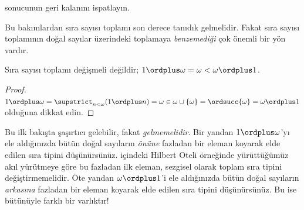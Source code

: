 \begin{prob}
 sonucunun geri
kalanını ispatlayın.
\end{prob}

Bu bakımlardan sıra sayısı toplamı son derece tanıdık gelmelidir. Fakat sıra
sayısı toplamının doğal sayılar üzerindeki toplamaya 
\emph{benzemediği} çok
önemli bir yön vardır.

\begin{prop}
Sıra sayısı toplamı {değişmeli} değildir;
$1\ordplus\omega=\omega<\omega\ordplus1$.
\end{prop}

\begin{proof}
$1\ordplus\omega=\supstrict_{n<\omega}(1\ordplus n)
=\omega\in\omega\cup\{\omega\}=\ordsucc{\omega}=\omega\ordplus1$
olduğuna dikkat edin.
\end{proof}
\noindent
Bu ilk bakışta şaşırtıcı gelebilir, fakat 
\emph{gelmemelidir}. Bir yandan
$1\ordplus\omega$'yı ele aldığınızda bütün doğal sayıların
\emph{önüne} fazladan bir eleman koyarak elde edilen sıra tipini
düşünürsünüz.  içindeki Hilbert Oteli
örneğinde yürüttüğümüz akıl yürütmeye göre bu fazladan ilk eleman, sezgisel
olarak toplam sıra tipini değiştirmemelidir. Öte yandan
$\omega\ordplus1$'i ele aldığınızda bütün doğal sayıların 
\emph{arkasına}
fazladan bir eleman koyarak elde edilen sıra tipini düşünürsünüz. Bu ise
bütünüyle farklı bir varlıktır!

